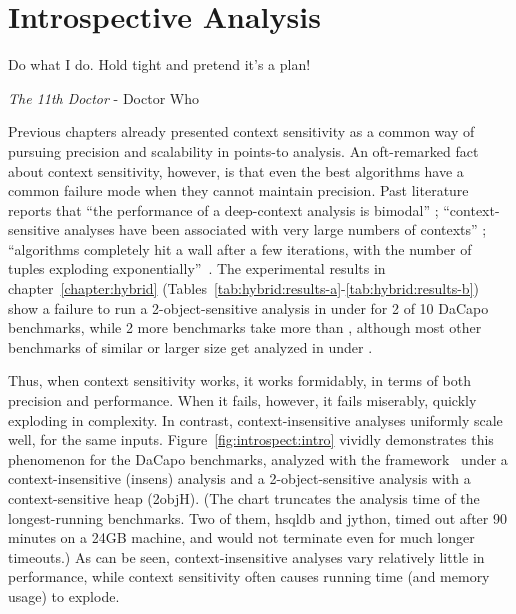 \chapter{Introspective Analysis}
\label{chapter:introspective}
\epigraph{Do what I do. Hold tight and pretend it’s a plan!}{\textit{The 11th Doctor} - Doctor Who}

Previous chapters already presented context sensitivity as a common way of pursuing precision and scalability in points-to analysis. An oft-remarked fact about context sensitivity, however, is that even the best algorithms have a common failure mode when they cannot maintain precision. Past literature reports that ``the performance of a deep-context analysis is bimodal'' \cite{popl:2011:Smaragdakis}; ``context-sensitive analyses have been associated with very large numbers of contexts'' \cite{cc:2006:Lhotak}; ``algorithms completely hit a wall after a few iterations, with the number of tuples exploding exponentially''~\cite{pldi:2011:Liang}. The experimental results in chapter~\ref{chapter:hybrid} (Tables~\ref{tab:hybrid:results-a}-\ref{tab:hybrid:results-b}) show a failure to run a 2-object-sensitive analysis in under  for 2 of 10 DaCapo benchmarks, while 2 more benchmarks take more than , although most other benchmarks of similar or larger size get analyzed in under .

Thus, when context sensitivity works, it works formidably, in terms of both precision and performance. When it fails, however, it fails miserably, quickly exploding in complexity. In contrast, context-insensitive analyses uniformly scale well, for the same inputs. Figure~\ref{fig:introspect:intro} vividly demonstrates this phenomenon for the DaCapo benchmarks, analyzed with the \doop{} framework~\cite{oopsla:2009:Bravenboer} under a context-insensitive (insens) analysis and a 2-object-sensitive analysis with a context-sensitive heap (2objH). (The chart truncates the analysis time of the longest-running benchmarks. Two of them, hsqldb and jython, timed out after 90 minutes on a 24GB machine, and would not terminate even for much longer timeouts.) As can be seen, context-insensitive analyses vary relatively little in performance, while context sensitivity often causes running time (and memory usage) to explode.

